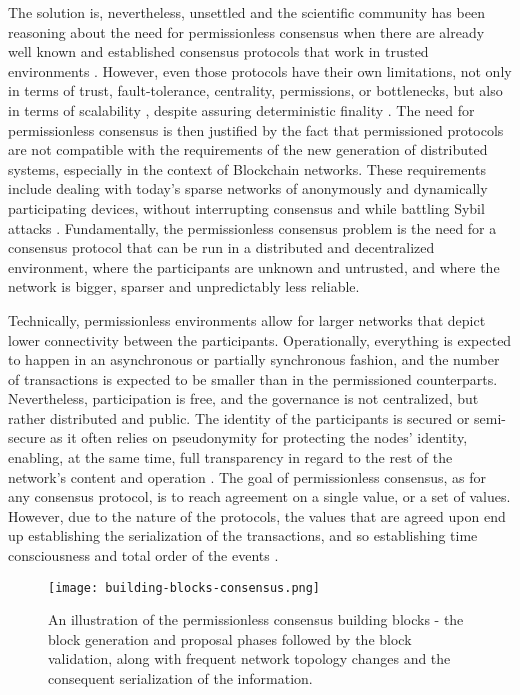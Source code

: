The solution is, nevertheless, unsettled and the scientific community has been reasoning about the need for permissionless consensus when there are already well known and established consensus protocols that work in trusted environments \cite{castro1999practical, miller2016honey}. However, even those protocols have their own limitations, not only in terms of trust, fault-tolerance, centrality, permissions, or bottlenecks, but also in terms of scalability \cite{miller2016honey}, despite assuring deterministic finality \cite{decker2016bitcoin}. The need for permissionless consensus is then justified by the fact that permissioned protocols are not compatible with the requirements of the new generation of distributed systems, especially in the context of Blockchain networks. These requirements include dealing with today's sparse networks of anonymously and dynamically participating devices, without interrupting consensus and while battling Sybil attacks \cite{8629877, survey-dist-consensus}. Fundamentally, the permissionless consensus problem is the need for a consensus protocol that can be run in a distributed and decentralized environment, where the participants are unknown and untrusted, and where the network is bigger, sparser and unpredictably less reliable.

Technically, permissionless environments allow for larger networks that depict lower connectivity between the participants. Operationally, everything is expected to happen in an asynchronous or partially synchronous fashion, and the number of transactions is expected to be smaller than in the permissioned counterparts. Nevertheless, participation is free, and the governance is not centralized, but rather distributed and public. The identity of the participants is secured or semi-secure as it often relies on pseudonymity for protecting the nodes' identity, enabling, at the same time, full transparency in regard to the rest of the network's content and operation \cite{xiao2019distributed}. The goal of permissionless consensus, as for any consensus protocol, is to reach agreement on a single value, or a set of values. However, due to the nature of the protocols, the values that are agreed upon end up establishing the serialization of the transactions, and so establishing time consciousness and total order of the events \cite{8629877}.

\begin{figure}[ht]
  \begin{center}
  \texttt{[image: building-blocks-consensus.png]}
  \caption{An illustration of the permissionless consensus building blocks - 
  the block generation and proposal phases followed by the block validation, 
  along with frequent network topology changes and the consequent serialization of the information.}
  \label{fig:building-blocks-consensus}
  \end{center}
\end{figure}

